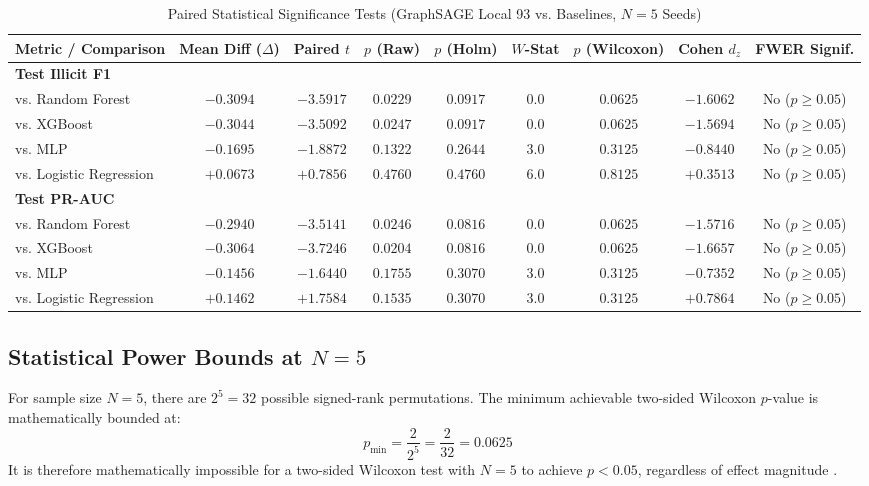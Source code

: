 \documentclass[conference]{IEEEtran}
\begin{document}
\begin{table}[t]
\centering
\caption{Paired Statistical Significance Tests (GraphSAGE Local 93 vs. Baselines, $N=5$ Seeds)}
\label{tab:stats_tests}
\begin{tabular}{lcccccccc}
\toprule
\textbf{Metric / Comparison} & \textbf{Mean Diff ($\Delta$)} & \textbf{Paired $t$} & \textbf{$p$ (Raw)} & \textbf{$p$ (Holm)} & \textbf{$W$-Stat} & \textbf{$p$ (Wilcoxon)} & \textbf{Cohen $d_z$} & \textbf{FWER Signif.} \\
\midrule
\textbf{Test Illicit F1} & & & & & & & & \\
vs. Random Forest & $-0.3094$ & $-3.5917$ & $0.0229$ & $0.0917$ & $0.0$ & $0.0625$ & $-1.6062$ & No ($p \ge 0.05$) \\
vs. XGBoost & $-0.3044$ & $-3.5092$ & $0.0247$ & $0.0917$ & $0.0$ & $0.0625$ & $-1.5694$ & No ($p \ge 0.05$) \\
vs. MLP & $-0.1695$ & $-1.8872$ & $0.1322$ & $0.2644$ & $3.0$ & $0.3125$ & $-0.8440$ & No ($p \ge 0.05$) \\
vs. Logistic Regression & $+0.0673$ & $+0.7856$ & $0.4760$ & $0.4760$ & $6.0$ & $0.8125$ & $+0.3513$ & No ($p \ge 0.05$) \\
\midrule
\textbf{Test PR-AUC} & & & & & & & & \\
vs. Random Forest & $-0.2940$ & $-3.5141$ & $0.0246$ & $0.0816$ & $0.0$ & $0.0625$ & $-1.5716$ & No ($p \ge 0.05$) \\
vs. XGBoost & $-0.3064$ & $-3.7246$ & $0.0204$ & $0.0816$ & $0.0$ & $0.0625$ & $-1.6657$ & No ($p \ge 0.05$) \\
vs. MLP & $-0.1456$ & $-1.6440$ & $0.1755$ & $0.3070$ & $3.0$ & $0.3125$ & $-0.7352$ & No ($p \ge 0.05$) \\
vs. Logistic Regression & $+0.1462$ & $+1.7584$ & $0.1535$ & $0.3070$ & $3.0$ & $0.3125$ & $+0.7864$ & No ($p \ge 0.05$) \\
\bottomrule
\end{tabular}
\end{table}

\subsection{Statistical Power Bounds at $N=5$}
For sample size $N = 5$, there are $2^5 = 32$ possible signed-rank permutations. The minimum achievable two-sided Wilcoxon $p$-value is mathematically bounded at:
\begin{equation}
p_{\min} = \frac{2}{2^5} = \frac{2}{32} = 0.0625
\label{eq:power_bound}
\end{equation}
It is therefore mathematically impossible for a two-sided Wilcoxon test with $N=5$ to achieve $p < 0.05$, regardless of effect magnitude \cite{wilcoxon1945individual, demsar2006statistical}.
\end{document}
